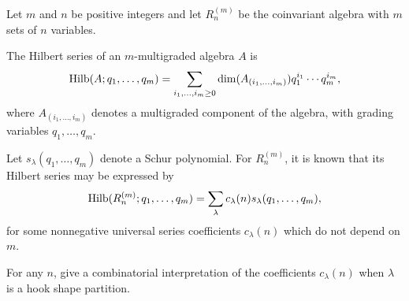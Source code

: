 Let $m$ and $n$ be positive integers and let $R_n^{(m)}$ be the coinvariant algebra with $m$ sets of $n$ variables.

The Hilbert series of an $m$-multigraded algebra $A$ is
$$
{\rm Hilb}(A;q_1,\ldots ,q_m)= \sum_{i_1,\ldots,i_m \geq 0} \dim(A_{(i_1,\ldots,i_m)})q_1^{i_1} \cdots q_m^{i_m},
$$
where $A_{(i_1,\ldots,i_m)}$ denotes a multigraded component of the algebra, with grading variables $q_1,\ldots, q_m$.

Let $s_\lambda(q_1,\ldots ,q_m)$ denote a Schur polynomial. For $R_n^{(m)}$, it is known that its Hilbert series may be expressed by 
$$
{\rm Hilb}(R_n^{(m)};q_1,\ldots ,q_m)= \sum_{\lambda}
c_{\lambda}(n)s_\lambda(q_1,\ldots ,q_m),
$$
for some nonnegative universal series coefficients $c_\lambda(n)$ which do not depend on $m$.

For any $n$, give a combinatorial interpretation of the coefficients $c_{\lambda}(n)$ when $\lambda$ is a hook shape partition.
